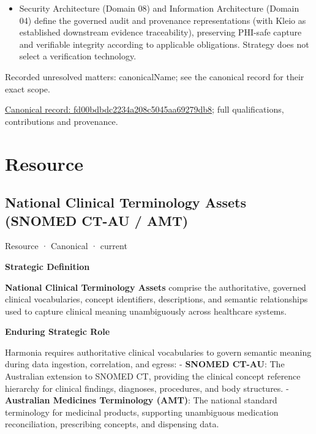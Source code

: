 \begin{itemize}


\item Security Architecture (Domain 08) and Information Architecture (Domain 04) define the governed audit and provenance representations (with Kleio as established downstream evidence traceability), preserving PHI-safe capture and verifiable integrity according to applicable obligations. Strategy does not select a verification technology.

\end{itemize}

{\small Recorded unresolved matters: canonicalName; see the canonical record for their exact scope.}\par
{\footnotesize \href{../../../../continuum/strategy/course-of-action/fd00bdbdc2234a208c5045aa69279db8.md}{Canonical record: fd00bdbdc2234a208c5045aa69279db8}; full qualifications, contributions and provenance.}\par
\section{Resource}

\subsection{National Clinical Terminology Assets (SNOMED CT-AU / AMT)}

\label{element:430f641e40aa4bd4a8e85a5cbc1f93be}
{\small Resource · Canonical · current}\par

\par\medskip\textbf{Strategic Definition}\par


\textbf{National Clinical Terminology Assets} comprise the authoritative, governed clinical vocabularies, concept identifiers, descriptions, and semantic relationships used to capture clinical meaning unambiguously across healthcare systems.



\par\medskip\textbf{Enduring Strategic Role}\par


Harmonia requires authoritative clinical vocabularies to govern semantic meaning during data ingestion, correlation, and egress:
- \textbf{SNOMED CT-AU}: The Australian extension to SNOMED CT, providing the clinical concept reference hierarchy for clinical findings, diagnoses, procedures, and body structures.
- \textbf{Australian Medicines Terminology (AMT)}: The national standard terminology for medicinal products, supporting unambiguous medication reconciliation, prescribing concepts, and dispensing data.



